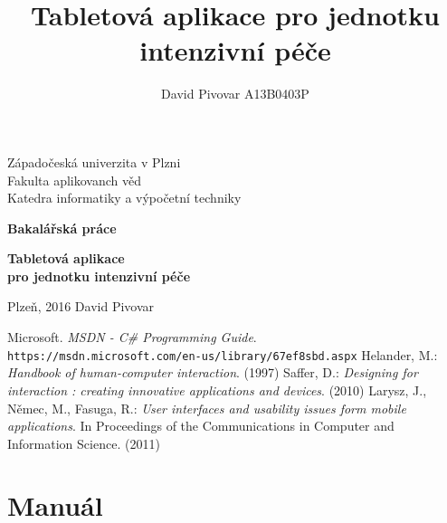 \documentclass[12pt, a4paper]{report}
\title{Tabletová aplikace pro jednotku intenzivní péče}
\author{David Pivovar A13B0403P}
\begin{document}
\begin{titlepage}

\begin{center}
	
	{\fontsize{22}{0} \selectfont
		Západočeská univerzita v Plzni\\
		Fakulta aplikovanch věd\\
		Katedra informatiky a výpočetní techniky\\
	}
	
	\vfill
	\vfill
	
	{\fontsize{28}{0} \textbf{
		Bakalářská práce\\
	}}
	
	\vfill
	
	{\fontsize{36}{0} \textbf{
		Tabletová aplikace\\pro jednotku intenzivní péče
	}}

\end{center}

\vfill
\vfill
\vfill
\vfill

\begin{flushleft}

	{\fontsize{16}{0} \selectfont
		Plzeň, 2016
		\hfill
		David Pivovar
	}
	
\end{flushleft}

\end{titlepage}




\tableofcontents

\setlength{\parskip}{1em}






%
%


\setlength{\parskip}{0em}

\begin{thebibliography}{9}
	 Microsoft. \textit{MSDN - C\# Programming Guide}. \\\texttt{https://msdn.microsoft.com/en-us/library/67ef8sbd.aspx}
	 Helander, M.: \textit{Handbook of human-computer interaction}. (1997)
	 Saffer, D.: \textit{Designing for interaction : creating innovative applications and devices}. (2010)
	 Larysz, J., Němec, M., Fasuga, R.: \textit{User interfaces and usability issues form mobile applications}. In Proceedings of the Communications in Computer and Information Science. (2011)
\end{thebibliography}

\listoffigures
{}

\chapter*{Manuál}

\end{document}
